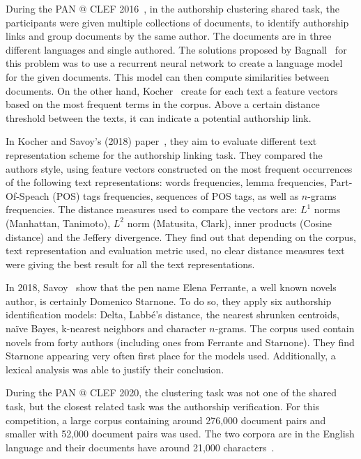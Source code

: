 During the PAN @ CLEF 2016~\cite{pan16}, in the authorship clustering shared task, the participants were given multiple collections of documents, to identify authorship links and group documents by the same author.
The documents are in three different languages and single authored.
The solutions proposed by Bagnall~\cite{bagnall_pan16} for this problem was to use a recurrent neural network to create a language model for the given documents. This model can then compute similarities between documents.
On the other hand, Kocher~\cite{kocher_pan16} create for each text a feature vectors based on the most frequent terms in the corpus.
Above a certain distance threshold between the texts, it can indicate a potential authorship link.

In Kocher and Savoy's (2018) paper~\cite{kocher_linking}, they aim to evaluate different text representation scheme for the authorship linking task.
They compared the authors style, using feature vectors constructed on the most frequent occurrences of the following text representations: words frequencies, lemma frequencies, Part-Of-Speach (POS) tags frequencies, sequences of POS tags, as well as $n$-grams frequencies.
The distance measures used to compare the vectors are: $L^1$ norms (Manhattan, Tanimoto), $L^2$ norm (Matusita, Clark), inner products (Cosine distance) and the Jeffery divergence.
They find out that depending on the corpus, text representation and evaluation metric used, no clear distance measures text were giving the best result for all the text representations.

In 2018, Savoy~\cite{savoy_starnone} show that the pen name Elena Ferrante, a well known novels author, is certainly Domenico Starnone.
To do so, they apply six authorship identification models: Delta, Labbé's distance, the nearest shrunken centroids, naïve Bayes, k-nearest neighbors and character $n$-grams.
The corpus used contain novels from forty authors (including ones from Ferrante and Starnone).
They find Starnone appearing very often first place for the models used.
Additionally, a lexical analysis was able to justify their conclusion.

During the PAN @ CLEF 2020, the clustering task was not one of the shared task, but the closest related task was the authorship verification.
For this competition, a large corpus containing around 276,000 document pairs and smaller with 52,000 document pairs was used.
The two corpora are in the English language and their documents have around 21,000 characters~\cite{overview_pan20}.

